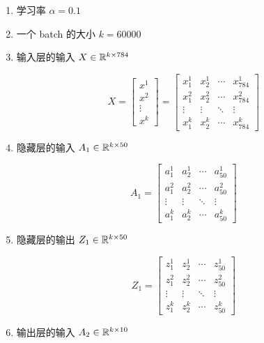 \documentclass[12pt,a4paper]{amsart}
\begin{document}
\begin{enumerate}
	\item 学习率 $\alpha = 0.1$
	\item 一个 batch 的大小 $k = 60000$
	\item 输入层的输入 $X \in \mathbb{R}^{k \times 784}$

		\begin{equation}
			X = \begin{bmatrix}
				x^1    \\
				x^2    \\
				\vdots \\
				x^k
			\end{bmatrix} = \begin{bmatrix}
				x_1^1  & x_2^1  & \cdots & x_{784}^1 \\
				x_1^2  & x_2^2  & \cdots & x_{784}^2 \\
				\vdots & \vdots & \ddots & \vdots    \\
				x_1^k  & x_2^k  & \cdots & x_{784}^k
			\end{bmatrix}
		\end{equation}

	\item 隐藏层的输入 $A_1 \in \mathbb{R}^{k \times 50}$

		\begin{equation}
			A_1 = \begin{bmatrix}
				a_1^1  & a_2^1  & \cdots & a_{50}^1 \\
				a_1^2  & a_2^2  & \cdots & a_{50}^2 \\
				\vdots & \vdots & \ddots & \vdots    \\
				a_1^k  & a_2^k  & \cdots & a_{50}^k
			\end{bmatrix}
		\end{equation}

	\item 隐藏层的输出 $Z_1 \in \mathbb{R}^{k \times 50}$

		\begin{equation}
			Z_1 = \begin{bmatrix}
				z_1^1  & z_2^1  & \cdots & z_{50}^1 \\
				z_1^2  & z_2^2  & \cdots & z_{50}^2 \\
				\vdots & \vdots & \ddots & \vdots    \\
				z_1^k  & z_2^k  & \cdots & z_{50}^k
			\end{bmatrix}
		\end{equation}

	\item 输出层的输入 $A_2 \in \mathbb{R}^{k \times 10}$


\end{enumerate}
\end{document}
